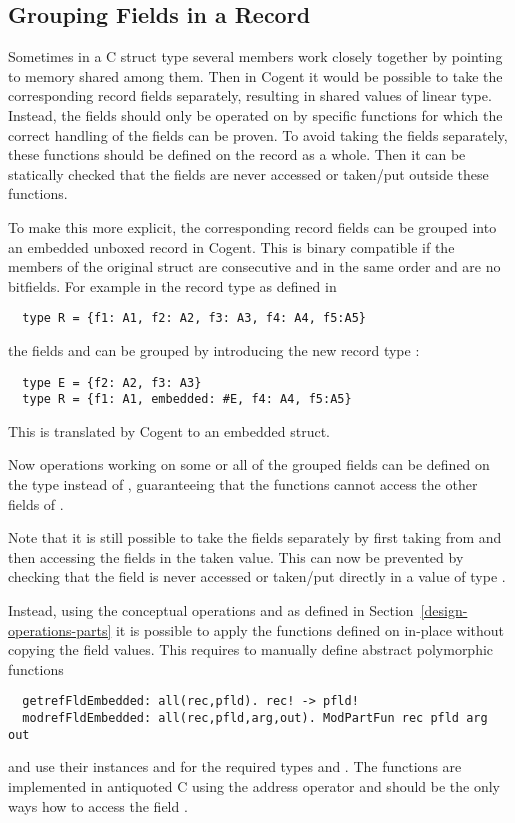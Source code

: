 \subsection{Grouping Fields in a Record}
\label{app-transtype-group}

Sometimes in a C struct type several members work closely together by pointing to memory
shared among them. Then in Cogent it would be possible to take the corresponding record fields separately,
resulting in shared values of linear type. Instead, the fields should only be operated on by specific functions
for which the correct handling of the fields can be proven. To avoid taking the fields separately, these
functions should be defined on the record as a whole. Then it can be statically checked that the fields
are never accessed or taken/put outside these functions.

To make this more explicit, the corresponding record fields can be grouped into an embedded unboxed
record in Cogent. This is binary compatible if the members of the original struct are consecutive and in
the same order and are no bitfields. For example in the record type  as defined in 
\begin{verbatim}
  type R = {f1: A1, f2: A2, f3: A3, f4: A4, f5:A5}
\end{verbatim}
the fields  and  can be grouped by introducing the new record type :
\begin{verbatim}
  type E = {f2: A2, f3: A3}
  type R = {f1: A1, embedded: #E, f4: A4, f5:A5}
\end{verbatim}
This is translated by Cogent to an embedded struct.

Now operations working on some or all of the grouped fields can be defined on the type  instead
of , guaranteeing that the functions cannot access the other fields of .

Note that it is still possible to take the fields separately by first taking  from 
and then accessing the fields in the taken value. This can now be prevented by checking that the field
 is never accessed or taken/put directly in a value of type .

Instead, using the conceptual operations  and  as defined in 
Section~\ref{design-operations-parts} it is possible to apply the functions defined on  
in-place without copying the field values. This requires to manually define abstract polymorphic functions
\begin{verbatim}
  getrefFldEmbedded: all(rec,pfld). rec! -> pfld!
  modrefFldEmbedded: all(rec,pfld,arg,out). ModPartFun rec pfld arg out
\end{verbatim}
and use their instances  and  for the required 
types  and . The functions are implemented in antiquoted C using the address operator \code{\&} and should
be the only ways how to access the field .

